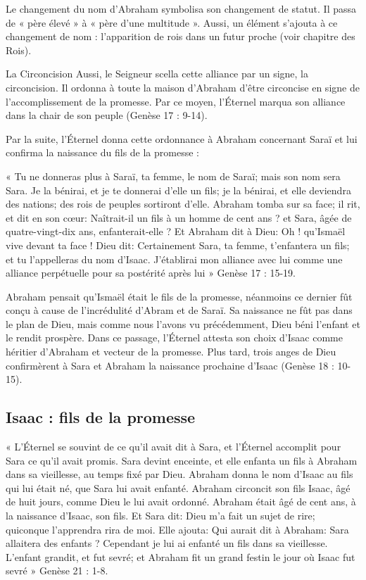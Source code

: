 Le changement du nom d'Abraham symbolisa son changement de statut. Il passa de « père élevé » à « père d'une multitude ». Aussi, un élément s'ajouta à ce changement de nom : l'apparition de rois dans un futur proche (voir chapitre des Rois).

La Circoncision
Aussi, le Seigneur scella cette alliance par un signe, la circoncision. Il ordonna à toute la maison d'Abraham d'être circoncise en signe de l'accomplissement de la promesse. Par ce moyen, l’Éternel marqua son alliance dans la chair de son peuple (Genèse 17 : 9-14).

Par la suite, l’Éternel donna cette ordonnance à Abraham concernant Saraï et lui confirma la naissance du fils de la promesse :

« Tu ne donneras plus à Saraï, ta femme, le nom de Saraï; mais son nom sera Sara. Je la bénirai, et je te donnerai d'elle un fils; je la bénirai, et elle deviendra des nations; des rois de peuples sortiront d'elle. Abraham tomba sur sa face; il rit, et dit en son cœur: Naîtrait-il un fils à un homme de cent ans ? et Sara, âgée de quatre-vingt-dix ans, enfanterait-elle ? Et Abraham dit à Dieu: Oh ! qu'Ismaël vive devant ta face ! Dieu dit: Certainement Sara, ta femme, t'enfantera un fils; et tu l'appelleras du nom d'Isaac. J'établirai mon alliance avec lui comme une alliance perpétuelle pour sa postérité après lui » Genèse 17 : 15-19.

Abraham pensait qu'Ismaël était le fils de la promesse, néanmoins ce dernier fût conçu à cause de l'incrédulité d'Abram et de Saraï. Sa naissance ne fût pas dans le plan de Dieu, mais comme nous l'avons vu précédemment, Dieu béni l'enfant et le rendit prospère. Dans ce passage, l’Éternel attesta son choix d'Isaac comme héritier d'Abraham et vecteur de la promesse.
Plus tard, trois anges de Dieu confirmèrent à Sara et Abraham la naissance prochaine d'Isaac (Genèse 18 : 10-15).

\subsection*{Isaac : fils de la promesse}

« L'Éternel se souvint de ce qu'il avait dit à Sara, et l'Éternel accomplit pour Sara ce qu'il avait promis. Sara devint enceinte, et elle enfanta un fils à Abraham dans sa vieillesse, au temps fixé par Dieu. Abraham donna le nom d'Isaac au fils qui lui était né, que Sara lui avait enfanté. Abraham circoncit son fils Isaac, âgé de huit jours, comme Dieu le lui avait ordonné. Abraham était âgé de cent ans, à la naissance d'Isaac, son fils. Et Sara dit: Dieu m'a fait un sujet de rire; quiconque l'apprendra rira de moi. Elle ajouta: Qui aurait dit à Abraham: Sara allaitera des enfants ? Cependant je lui ai enfanté un fils dans sa vieillesse. L'enfant grandit, et fut sevré; et Abraham fit un grand festin le jour où Isaac fut sevré » Genèse 21 : 1-8.


